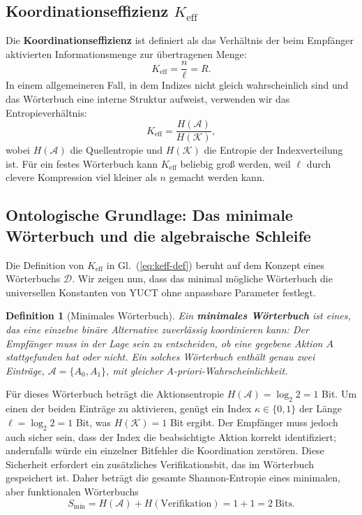 \documentclass[12pt,a4paper]{article}
\newtheorem{definition}[theorem]{Definition}
\theoremstyle{remark}
\newcommand{\Keff}{K_{\mathrm{eff}}}
\begin{document}
	\subsection{Koordinationseffizienz $\Keff$}
	\label{sec:keff-def}
	
	Die \textbf{Koordinationseffizienz} ist definiert als das Verhältnis der beim Empfänger aktivierten Informationsmenge zur übertragenen Menge:
	\begin{equation}
		\Keff = \frac{n}{\ell} = R. \label{eq:keff-def}
	\end{equation}
	In einem allgemeineren Fall, in dem Indizes nicht gleich wahrscheinlich sind und das Wörterbuch eine interne Struktur aufweist, verwenden wir das Entropieverhältnis:
	\begin{equation}
		\Keff = \frac{H(\mathcal{A})}{H(\mathcal{K})},
	\end{equation}
	wobei $H(\mathcal{A})$ die Quellentropie und $H(\mathcal{K})$ die Entropie der Indexverteilung ist. Für ein festes Wörterbuch kann $\Keff$ beliebig groß werden, weil $\ell$ durch clevere Kompression viel kleiner als $n$ gemacht werden kann.
	
	\subsection{Ontologische Grundlage: Das minimale Wörterbuch und die algebraische Schleife}
	\label{subsec:minimal-dict}
	
	Die Definition von \(K_{\mathrm{eff}}\) in Gl.~(\ref{eq:keff-def}) beruht auf dem Konzept eines Wörterbuchs \(\mathcal{D}\). Wir zeigen nun, dass das minimal mögliche Wörterbuch die universellen Konstanten von YUCT ohne anpassbare Parameter festlegt.
	
	\begin{definition}[Minimales Wörterbuch]
		Ein \textbf{minimales Wörterbuch} ist eines, das eine einzelne binäre Alternative zuverlässig koordinieren kann: Der Empfänger muss in der Lage sein zu entscheiden, ob eine gegebene Aktion \(A\) stattgefunden hat oder nicht. Ein solches Wörterbuch enthält genau zwei Einträge, \(\mathcal{A} = \{A_0, A_1\}\), mit gleicher A-priori-Wahrscheinlichkeit.
	\end{definition}
	
	Für dieses Wörterbuch beträgt die Aktionsentropie \(H(\mathcal{A}) = \log_2 2 = 1\) Bit. Um einen der beiden Einträge zu aktivieren, genügt ein Index \(\kappa \in \{0,1\}\) der Länge \(\ell = \log_2 2 = 1\) Bit, was \(H(\mathcal{K}) = 1\) Bit ergibt. Der Empfänger muss jedoch auch sicher sein, dass der Index die beabsichtigte Aktion korrekt identifiziert; andernfalls würde ein einzelner Bitfehler die Koordination zerstören. Diese Sicherheit erfordert ein zusätzliches Verifikationsbit, das im Wörterbuch gespeichert ist. Daher beträgt die gesamte Shannon-Entropie eines minimalen, aber funktionalen Wörterbuchs
	\begin{equation}
		S_{\min} = H(\mathcal{A}) + H(\text{Verifikation}) = 1 + 1 = 2\ \text{Bits}.
		\label{eq:smin}
	\end{equation}
	
\end{document}
